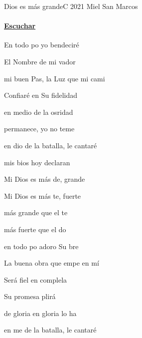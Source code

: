 \documentclass[12pt, spanish]{book}
\newcommand{\NotCCLIed}{\relax}
\begin{document}
    \begin{song}{Dios es más grande}{C}
        {2021} %
        {Miel San Marcos}
        {} %
        {} %
        \ifChordBk
        \paragraph{\mbox{}\hfill\protect\href{https://open.spotify.com/intl-es/track/61nCXpmkNR2c196EaZhYgx}{Escuchar}\mbox{}\hfill}
        \fi


        \begin{SBOpGroup}
            En todo po yo bendeciré

            El Nombre de mi vador

            mi buen Pas, la Luz que  mi cami

            Confiaré en Su fidelidad

            en medio de la osridad

            permanece, yo no teme

            en dio de la batalla,  le cantaré

            mis bios hoy declaran 
        \end{SBOpGroup}

        \begin{SBChorus}
            Mi Dios es más de, grande

            Mi Dios es más te, fuerte

            más grande que el te

            más fuerte que el do

            en todo po adoro Su bre 
        \end{SBChorus}

        \begin{SBOpGroup}
            La buena obra que empe en mí

            Será fiel en complela

            Su promesa plirá

            de gloria en gloria lo ha

            en me de la batalla,  le cantaré


\end{SBOpGroup}
\end{song}
\end{document}
